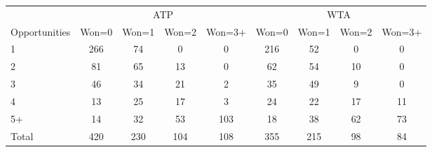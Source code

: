 \begin{tabular}{l cccc cccc}
\toprule
 & \multicolumn{4}{c}{ATP} & \multicolumn{4}{c}{WTA} \\
\cmidrule(lr){2-5} \cmidrule(lr){6-9}
Opportunities & Won=0 & Won=1 & Won=2 & Won=3+ & Won=0 & Won=1 & Won=2 & Won=3+ \\
\midrule
1 & 266 & 74 & 0 & 0 & 216 & 52 & 0 & 0 \\
2 & 81 & 65 & 13 & 0 & 62 & 54 & 10 & 0 \\
3 & 46 & 34 & 21 & 2 & 35 & 49 & 9 & 0 \\
4 & 13 & 25 & 17 & 3 & 24 & 22 & 17 & 11 \\
5+ & 14 & 32 & 53 & 103 & 18 & 38 & 62 & 73 \\
\midrule
Total & 420 & 230 & 104 & 108 & 355 & 215 & 98 & 84 \\
\bottomrule
\end{tabular}
